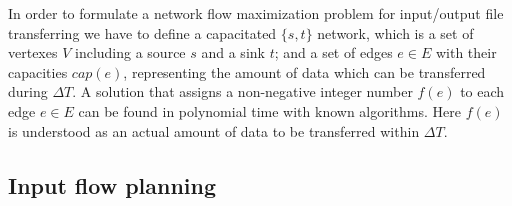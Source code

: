 \documentclass{svjour3}                     %
\begin{document}
In order to formulate a network flow maximization problem \cite{Network_flows}
for input/output file transferring we have to define a capacitated $\{s,t\}$
network, which is a set of vertexes $V$ including a source $s$ and a sink $t$;
and a set of edges $e\in E$ with their capacities $cap(e)$, representing the amount of data which can be transferred during $\Delta T$. A solution that
assigns a non-negative integer number $f(e)$ to each edge $e \in E$ can be
found in polynomial time with known algorithms. Here $f(e)$ is understood as an actual amount of data to be transferred within $\Delta T$.

\subsection{Input flow planning}
\end{document}
